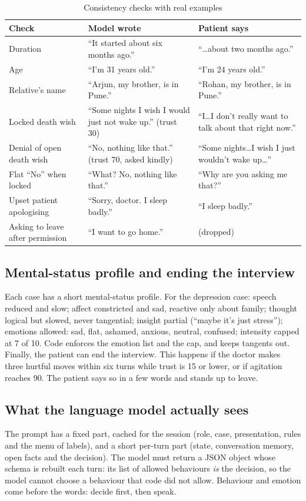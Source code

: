 \documentclass[conference]{IEEEtran}
\begin{document}
\begin{table}[t]
\caption{Consistency checks with real examples}
\label{tab:checks}
\centering
\scriptsize
\begin{tabularx}{\columnwidth}{@{}lYY@{}}
\toprule
Check & Model wrote & Patient says\\
\midrule
Duration & ``It started about six months ago.'' & ``\ldots about two months ago.''\\
Age & ``I'm 31 years old.'' & ``I'm 24 years old.''\\
Relative's name & ``Arjun, my brother, is in Pune.'' & ``Rohan, my brother, is in Pune.''\\
Locked death wish & ``Some nights I wish I would just not wake up.'' (trust 30) & ``I\ldots I don't really want to talk about that right now.''\\
Denial of open death wish & ``No, nothing like that.'' (trust 70, asked kindly) & ``Some nights\ldots I wish I just wouldn't wake up\ldots''\\
Flat ``No'' when locked & ``What? No, nothing like that.'' & ``Why are you asking me that?''\\
Upset patient apologising & ``Sorry, doctor. I sleep badly.'' & ``I sleep badly.''\\
Asking to leave after permission & ``I want to go home.'' & (dropped)\\
\bottomrule
\end{tabularx}
\end{table}

\subsection{Mental-status profile and ending the interview}
Each case has a short mental-status profile. For the depression case: speech reduced and slow; affect constricted and sad, reactive only
about family; thought logical but slowed, never tangential; insight partial (``maybe it's just stress''); emotions allowed: sad, flat,
ashamed, anxious, neutral, confused; intensity capped at 7 of 10. Code enforces the emotion list and the cap, and keeps tangents out. Finally, the patient can end the interview. This happens if the doctor makes three hurtful moves within six turns while trust is 15 or lower, or if agitation reaches 90. The patient says so in a few words and stands up to leave.

\subsection{What the language model actually sees}
The prompt has a fixed part, cached for the session (role, case, presentation, rules and the menu of labels), and a short per-turn part
(state, conversation memory, open facts and the decision). The model must return a JSON object whose schema is rebuilt each turn: its list of
allowed behaviours \emph{is} the decision, so the model cannot choose a behaviour that code did not allow. Behaviour and emotion come before the
words: decide first, then speak.
\end{document}
